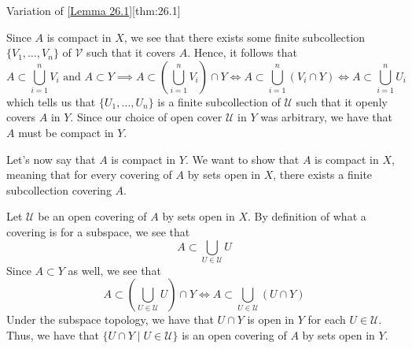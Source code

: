\begin{thmBox}{Variation of [\hyperlink{lem:26.1}{Lemma 26.1}]}[thm:26.1]
\begin{proofBox}
        Since \( A \) is compact in \( X \), we see that there exists some finite
        subcollection \( \{ V_{ 1 } , \ldots , V_{ n } \} \) of \( \mathcal{V} \) such
        that it covers \( A \).
        Hence, it follows that 
        \begin{equation*}
            A \subset \bigcup_{ i = 1 }^{ n } V_{ i }
            \text{ and }
            A \subset Y
            \implies 
            A \subset \left( \bigcup_{ i = 1 }^{ n } V_{ i } \right) \cap Y
            \iff 
            A \subset \bigcup_{ i = 1 }^{ n } ( V_{ i } \cap Y )
            \iff 
            A \subset \bigcup_{ i = 1 }^{ n } U_{ i }  
        \end{equation*}
        which tells us that \( \{ U_{ 1 } , \ldots , U_{ n } \} \) is a finite 
        subcollection of \( \mathcal{U} \) such that it openly covers \( A \) in 
        \( Y \).
        Since our choice of open cover \( \mathcal{U} \) in \( Y \) was arbitrary,
        we have that \( A \) must be compact in \( Y \).

        \baseSkip

        Let's now say that \( A \) is compact in \( Y \).
        We want to show that \( A \) is compact in \( X \), meaning that for every 
        covering of \( A \) by sets open in \( X \), there exists a finite subcollection
        covering \( A \).
        
        \baseSkip

        Let \( \mathcal{U} \) be an open covering of \( A \) by sets open in \( X \).
        By definition of what a covering is for a subspace, we see that 
        \begin{equation*}
            A \subset \bigcup_{ U \in \mathcal{U} } U
        \end{equation*}
        Since \( A \subset Y \) as well, we see that
        \begin{equation*}
            A \subset \left( \bigcup_{ U \in \mathcal{U} } U \right) \cap Y
            \iff 
            A \subset \bigcup_{ U \in \mathcal{U} } ( U \cap Y )
        \end{equation*}
        Under the subspace topology, we have that \( U \cap Y \) is open in \( Y \) for
        each \( U \in \mathcal{U} \).
        Thus, we have that \( \{ U \cap Y \mid U \in \mathcal{U} \} \) is an open 
        covering of \( A \) by sets open in \( Y \).
        
        \baseSkip


\end{proofBox}
\end{thmBox}
